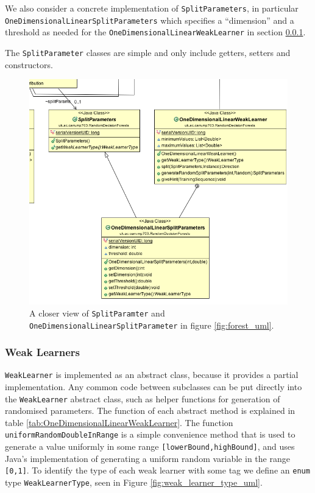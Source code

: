 \documentclass[12pt,twoside,notitlepage]{report}
\begin{document}
                We also consider a concrete implementation of \texttt{SplitParameters}, in particular
                \texttt{OneDimensionalLinearSplitParameters} which specifies a ``dimension'' and a threshold as needed 
                for the \texttt{OneDimensionalLinearWeakLearner} in section \ref{sec:weak_learner}. 

                The \texttt{SplitParameter} classes are simple and only include getters, setters and constructors. 

                \begin{figure}[H]
                    \centering
                    \includegraphics[scale=0.5]{SplitParam_Forest_UML}
                    \caption{A closer view of \texttt{SplitParamter} and \texttt{OneDimensionalLinearSplitParameter} in figure \ref{fig:forest_uml}.}
                    \label{fig:split_param_uml}
                \end{figure}




            \subsubsection{Weak Learners} \label{sec:weak_learner}
                \texttt{WeakLearner} is implemented as an abstract class, because it provides a partial 
                implementation. Any common code between subclasses can be put directly into the \texttt{WeakLearner} 
                abstract class, such as helper functions for generation of randomised parameters. The function of each 
                abstract method is explained in table \ref{tab:OneDimensionalLinearWeakLearner}. The function 
                \texttt{uniformRandomDoubleInRange} is a simple convenience method that is used to generate a value 
                uniformly in some range \texttt{[lowerBound,highBound]}, 
                and uses Java's implementation of generating a uniform random variable in the range \texttt{[0,1]}. To 
                identify the type of each weak learner with some tag we define an \texttt{enum} type 
                \texttt{WeakLearnerType}, seen in Figure \ref{fig:weak_learner_type_uml}. 
\end{document}
